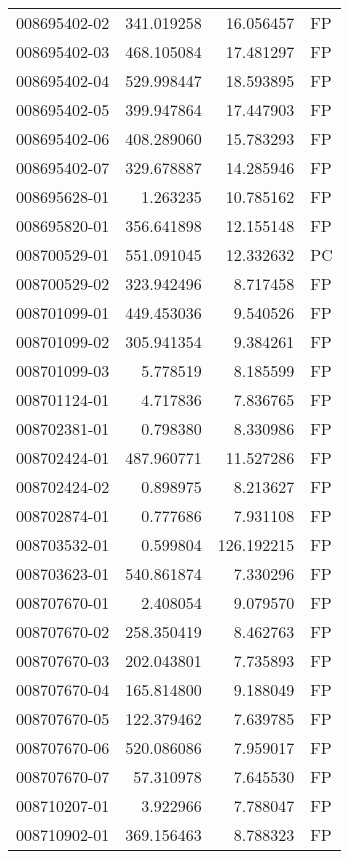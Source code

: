 \begin{tabular}{lrrl}
008695402-02 &  341.019258 &    16.056457 &   FP \\
008695402-03 &  468.105084 &    17.481297 &   FP \\
008695402-04 &  529.998447 &    18.593895 &   FP \\
008695402-05 &  399.947864 &    17.447903 &   FP \\
008695402-06 &  408.289060 &    15.783293 &   FP \\
008695402-07 &  329.678887 &    14.285946 &   FP \\
008695628-01 &    1.263235 &    10.785162 &   FP \\
008695820-01 &  356.641898 &    12.155148 &   FP \\
008700529-01 &  551.091045 &    12.332632 &   PC \\
008700529-02 &  323.942496 &     8.717458 &   FP \\
008701099-01 &  449.453036 &     9.540526 &   FP \\
008701099-02 &  305.941354 &     9.384261 &   FP \\
008701099-03 &    5.778519 &     8.185599 &   FP \\
008701124-01 &    4.717836 &     7.836765 &   FP \\
008702381-01 &    0.798380 &     8.330986 &   FP \\
008702424-01 &  487.960771 &    11.527286 &   FP \\
008702424-02 &    0.898975 &     8.213627 &   FP \\
008702874-01 &    0.777686 &     7.931108 &   FP \\
008703532-01 &    0.599804 &   126.192215 &   FP \\
008703623-01 &  540.861874 &     7.330296 &   FP \\
008707670-01 &    2.408054 &     9.079570 &   FP \\
008707670-02 &  258.350419 &     8.462763 &   FP \\
008707670-03 &  202.043801 &     7.735893 &   FP \\
008707670-04 &  165.814800 &     9.188049 &   FP \\
008707670-05 &  122.379462 &     7.639785 &   FP \\
008707670-06 &  520.086086 &     7.959017 &   FP \\
008707670-07 &   57.310978 &     7.645530 &   FP \\
008710207-01 &    3.922966 &     7.788047 &   FP \\
008710902-01 &  369.156463 &     8.788323 &   FP \\

\end{tabular}
